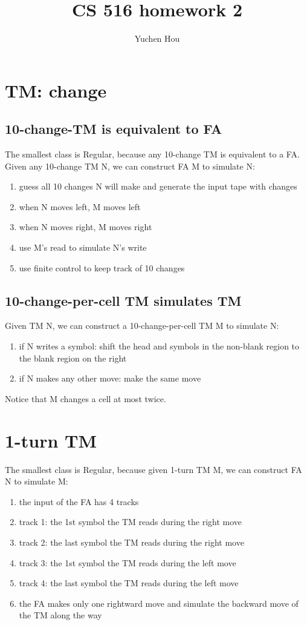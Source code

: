 \documentclass{article}
\begin{document}
\lstset{language=python, tabsize=4}
\title{CS 516 homework 2}
\author{Yuchen Hou}
\maketitle

\section{TM: change}

\subsection{10-change-TM is equivalent to FA}
The smallest class is Regular, because any 10-change TM is equivalent to a FA. Given any 10-change TM N, we can construct FA M to simulate N:
\begin{enumerate}
	\item guess all 10 changes N will make and generate the input tape with changes
	\item when N moves left, M moves left
	\item when N moves right, M moves right
	\item use M's read to simulate N's write
	\item use finite control to keep track of 10 changes
\end{enumerate}

\subsection{10-change-per-cell TM simulates TM}
Given TM N, we can construct a 10-change-per-cell TM M to simulate N:
\begin{enumerate}
	\item if N writes a symbol: shift the head and symbols in the
	non-blank region to the blank region on the right
	\item if N makes any other move: make the same move
\end{enumerate}
Notice that M changes a cell at most twice.

\section{1-turn TM}
The smallest class is Regular, because given 1-turn TM M, we can construct FA N to simulate M:
\begin{enumerate}
	\item the input of the FA has 4 tracks
	\item track 1: the 1st symbol the TM reads during the right move
	\item track 2: the last symbol the TM reads during the right move
	\item track 3: the 1st symbol the TM reads during the left move
	\item track 4: the last symbol the TM reads during the left move
	\item the FA makes only one rightward move and simulate the backward move of the TM along the way		
\end{enumerate}
\end{document}
